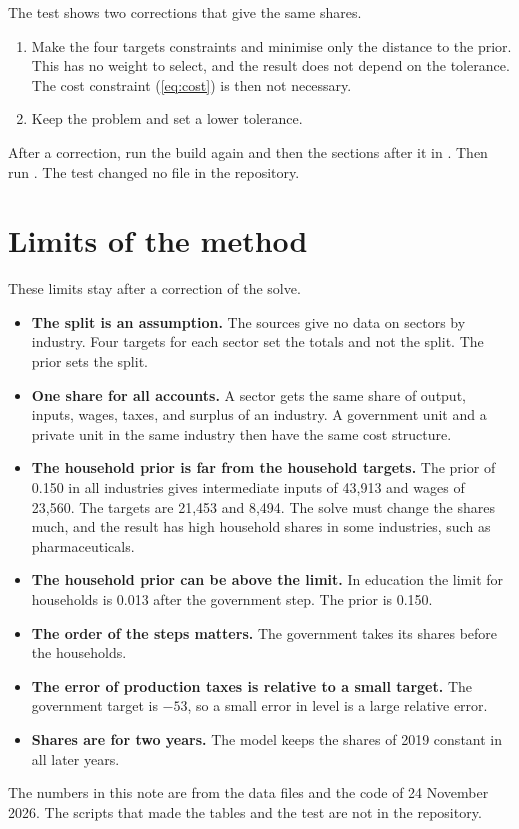 \documentclass[11pt,a4paper]{article}
\newcommand{\code}[1]{\texttt{\detokenize{#1}}}
\begin{document}
The test shows two corrections that give the same shares.
\begin{enumerate}
\item Make the four targets constraints and minimise only the distance to the prior. This has no weight to select, and the result does not depend on the tolerance. The cost constraint (\ref{eq:cost}) is then not necessary.
\item Keep the problem and set a lower tolerance.
\end{enumerate}
After a correction, run the build again and then the sections after it in \code{RefreshData.jl}. Then run \code{Calibrate.jl}.
The test changed no file in the repository.

\section{Limits of the method}

These limits stay after a correction of the solve.
\begin{itemize}
\item \textbf{The split is an assumption.} The sources give no data on sectors by industry. Four targets for each sector set the totals and not the split. The prior sets the split.
\item \textbf{One share for all accounts.} A sector gets the same share of output, inputs, wages, taxes, and surplus of an industry. A government unit and a private unit in the same industry then have the same cost structure.
\item \textbf{The household prior is far from the household targets.} The prior of 0.150 in all industries gives intermediate inputs of 43,913 and wages of 23,560. The targets are 21,453 and 8,494. The solve must change the shares much, and the result has high household shares in some industries, such as pharmaceuticals.
\item \textbf{The household prior can be above the limit.} In education the limit for households is 0.013 after the government step. The prior is 0.150.
\item \textbf{The order of the steps matters.} The government takes its shares before the households.
\item \textbf{The error of production taxes is relative to a small target.} The government target is $-53$, so a small error in level is a large relative error.
\item \textbf{Shares are for two years.} The model keeps the shares of 2019 constant in all later years.
\end{itemize}

The numbers in this note are from the data files and the code of 24 November 2026. The scripts that made the tables and the test are not in the repository.
\end{document}
